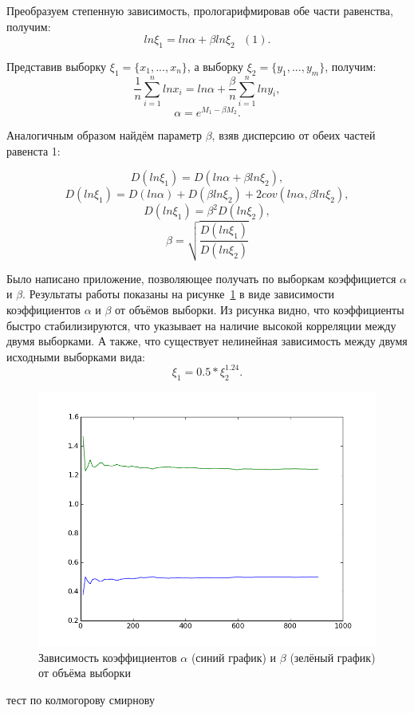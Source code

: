 \documentclass[12pt,a4paper,oneside]{extarticle}
\begin{document}
    Преобразуем степенную зависимость, прологарифмировав обе части равенства, получим: $$ln \xi_1 = ln \alpha + \beta ln \xi_2~~~ (1).$$


       
    Представив выборку $\xi_1 = \{x_1, . . . , x_n\}$, а выборку $\xi_2 = \{y_1, . . . , y_m\}$, получим:
    $$\frac{1}{n}\sum_{i=1}^{n} ln x_i = ln \alpha + \frac{\beta}{n} \sum_{i=1}^{n} ln y_i,$$
    $$\alpha = e^{M_1-\beta M_2}.$$

    Аналогичным образом найдём параметр $\beta$, взяв дисперсию от обеих частей равенста 1:

    $$D (ln \xi_1) = D(ln \alpha + \beta ln \xi_2),$$
    $$D (ln \xi_1) = D(ln \alpha) + D(\beta ln \xi_2) + 2 cov(ln \alpha, \beta ln \xi_2),$$
    $$D (ln \xi_1) = \beta^2 D(ln \xi_2), $$
    $$\beta = \sqrt{\frac{D (ln \xi_1)}{D (ln \xi_2)}}$$

    Было написано приложение, позволяющее получать по выборкам коэффициется $\alpha$ и $\beta$. Результаты работы показаны на рисунке~\ref{pic:tree} в виде зависимости коэффициентов $\alpha$ и $\beta$ от объёмов выборки. Из рисунка видно, что коэффициенты быстро стабилизируются, что указывает на наличие высокой корреляции между двумя выборками. А также, что существует нелинейная зависимость между двумя исходными выборками вида: $$\xi_1 = 0.5*\xi_2^{1.24}.$$ 

    \begin{figure}[h!]
        \center
        \includegraphics[scale=0.7]{../figure_1.png}
        \caption{Зависимость коэффициентов $\alpha$ (синий график) и $\beta$ (зелёный график) от объёма выборки}
        \label{pic:tree}
    \end{figure}

    тест по колмогорову смирнову
\end{document}
